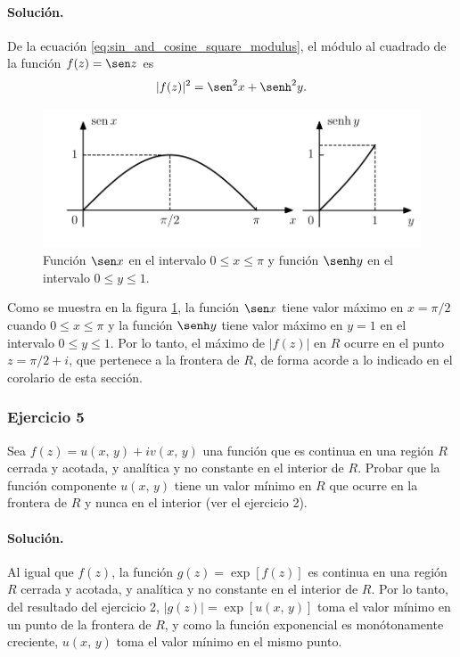 \documentclass[a4paper]{report}
\begin{document}
\paragraph{Solución.} De la ecuación \ref{eq:sin_and_cosine_square_modulus}, el módulo al cuadrado de la función \(f(z)=\sen z\) es
\[
 |f(z)|^2=\sen^2x+\senh^2y.
\]
\begin{figure}[!htb]
  \begin{minipage}[c]{0.7\textwidth}
    \includegraphics[width=\textwidth]{figuras/exercise_59_04_graphs.pdf}
  \end{minipage}\hfill
  \begin{minipage}[c]{0.2\textwidth}
    \caption{
       Función \(\sen x\) en el intervalo  \(0\leq x\leq\pi\) y función \(\senh y\) en el intervalo \(0\leq y\leq1\).
    }\label{fig:exercise_59_04_graphs}
  \end{minipage}
\end{figure}
Como se muestra en la figura \ref{fig:exercise_59_04_graphs}, la función \(\sen x\) tiene valor máximo en \(x=\pi/2\) cuando \(0\leq x\leq\pi\) y la función \(\senh y\) tiene valor máximo en \(y=1\) en el intervalo \(0\leq y\leq1\). Por lo tanto, el máximo de \(|f(z)|\) en \(R\) ocurre en el punto \(z=\pi/2+i\), que pertenece a la frontera de \(R\), de forma acorde a lo indicado en el corolario de esta sección. 

\subsubsection{Ejercicio 5}

Sea \(f(z)=u(x,\,y)+iv(x,\,y)\) una función que es continua en una región \(R\) cerrada y acotada, y analítica y no constante en el interior de \(R\). Probar que la función componente \(u(x,\,y)\) tiene un valor mínimo en \(R\) que ocurre en la frontera de \(R\) y nunca en el interior (ver el ejercicio 2).

\paragraph{Solución.} Al igual que \(f(z)\), la función \(g(z)=\exp[f(z)]\) es continua en una región \(R\) cerrada y acotada, y analítica y no constante en el interior de \(R\). Por lo tanto, del resultado del ejercicio 2, \(|g(z)|=\exp[u(x,\,y)]\) toma el valor mínimo en un punto de la frontera de \(R\), y como la función exponencial es monótonamente creciente, \(u(x,\,y)\) toma el valor mínimo en el mismo punto.
\end{document}
